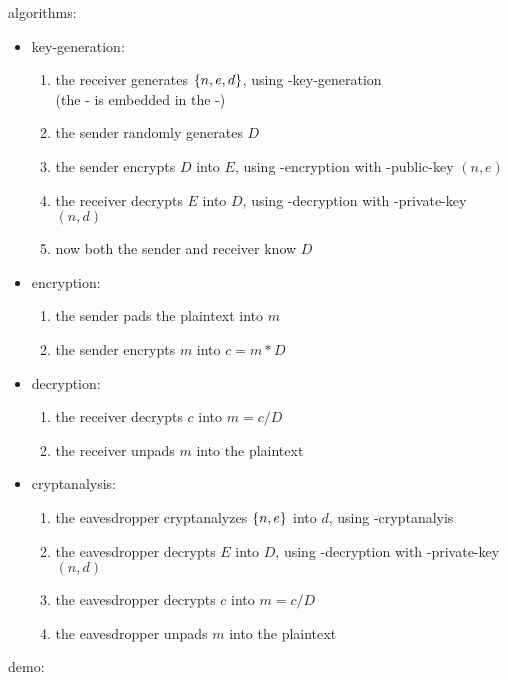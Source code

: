 algorithms:
\begin{itemize}
\item key-generation:
  \begin{enumerate}
  \item the receiver generates $\left\{ n, e, d \right\}$,
    using \rsa-key-generation \\
    (the \rsa-\cs{} is embedded in the \dummy-\cs)
  \item the sender randomly generates $D$
  \item the sender encrypts $D$ into $E$,
    using \rsa-encryption with \rsa-public-key $(n, e)$
  \item the receiver decrypts $E$ into $D$,
    using \rsa-decryption with \rsa-private-key $(n, d)$
  \item now both the sender and receiver know $D$
  \end{enumerate}
\item encryption:
  \begin{enumerate}
  \item the sender pads the plaintext into $m$
  \item the sender encrypts $m$ into $c = m * D$
  \end{enumerate}
\item decryption:
  \begin{enumerate}
  \item the receiver decrypts $c$ into $m = c / D$
  \item the receiver unpads $m$ into the plaintext
  \end{enumerate}
\item cryptanalysis:
  \begin{enumerate}
  \item the eavesdropper cryptanalyzes $\left\{ n, e \right\}$
    into $d$, using \rsa-cryptanalyis
  \item the eavesdropper decrypts $E$ into $D$,
    using \rsa-decryption with \rsa-private-key $(n, d)$
  \item the eavesdropper decrypts $c$ into $m = c / D$
  \item the eavesdropper unpads $m$ into the plaintext
  \end{enumerate}
\end{itemize}

demo:
\codes{}


\subsubsection{\cry{} \cf}


